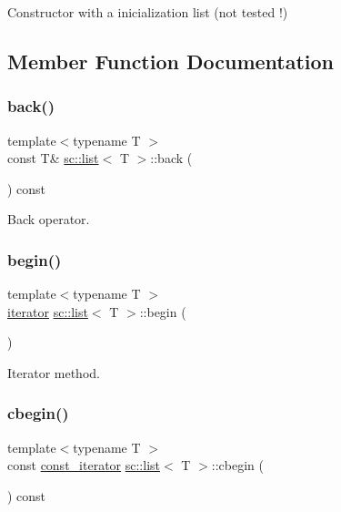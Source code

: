 Constructor with a inicialization list (not tested !) 



\subsection{Member Function Documentation}
\mbox{\label{classsc_1_1list_a4835abb7fb3362c357d534db60e0ba6e}} 
\subsubsection{\texorpdfstring{back()}{back()}}
{\footnotesize\ttfamily template$<$typename T $>$ \\
const T\& \hyperlink{classsc_1_1list}{sc\+::list}$<$ T $>$\+::back (\begin{DoxyParamCaption}{ }\end{DoxyParamCaption}) const\hspace{0.3cm}{\ttfamily [inline]}}



Back operator. 

\mbox{\label{classsc_1_1list_a2fa015e137583d7142933500b34f1e29}} 
\subsubsection{\texorpdfstring{begin()}{begin()}}
{\footnotesize\ttfamily template$<$typename T $>$ \\
\hyperlink{classsc_1_1list_1_1iterator}{iterator} \hyperlink{classsc_1_1list}{sc\+::list}$<$ T $>$\+::begin (\begin{DoxyParamCaption}{ }\end{DoxyParamCaption})\hspace{0.3cm}{\ttfamily [inline]}}



Iterator method. 

\mbox{\label{classsc_1_1list_ab198cb5a2a813b136d7f6689739052a5}} 
\subsubsection{\texorpdfstring{cbegin()}{cbegin()}}
{\footnotesize\ttfamily template$<$typename T $>$ \\
const \hyperlink{classsc_1_1list_1_1const__iterator}{const\+\_\+iterator} \hyperlink{classsc_1_1list}{sc\+::list}$<$ T $>$\+::cbegin (\begin{DoxyParamCaption}{ }\end{DoxyParamCaption}) const\hspace{0.3cm}{\ttfamily [inline]}}



